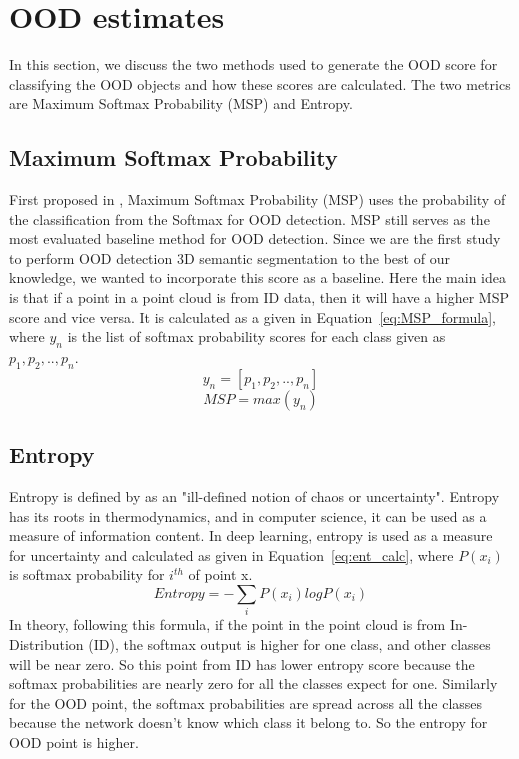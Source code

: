 \section{OOD estimates}
In this section, we discuss the two methods used to generate the OOD score for classifying the OOD objects and how these scores are calculated.
The two metrics are Maximum Softmax Probability (MSP) and Entropy.

\subsection{Maximum Softmax Probability}
First proposed in \cite{hendrycks2016baseline_MSP}, Maximum Softmax Probability (MSP) uses the probability of the classification from the Softmax for OOD detection. 
MSP still serves as the most evaluated baseline method for OOD detection.
Since we are the first study to perform OOD detection 3D semantic segmentation to the best of our knowledge, we wanted to incorporate this score as a baseline. 
Here the main idea is that if a point in a point cloud is from ID data, then it will have a higher MSP score and vice versa.
It is calculated as a given in Equation~\ref{eq:MSP_formula}, where $y_n$ is the list of softmax probability scores for each class given as $p_1, p_2, .., p_n$.
$$y_n = [p_1, p_2,..,p_n]$$
\begin{equation}
    MSP = max(y_n)
    \label{eq:MSP_formula}
\end{equation}

\subsection{Entropy}
\label{sec:meth_entropy}
Entropy is defined by \cite{entropy_robinson} as an "ill-defined notion of chaos or uncertainty".
Entropy has its roots in thermodynamics, and in computer science, it can be used as a measure of information content.
In deep learning, entropy is used as a measure for uncertainty and calculated as given in Equation~\ref{eq:ent_calc}, where $P(x_i)$ is softmax probability for $i^{th}$ of point x.
\begin{equation}
    Entropy = -\sum_i P(x_i) log P(x_i)
    \label{eq:ent_calc}
\end{equation}
In theory, following this formula, if the point in the point cloud is from In-Distribution (ID), the softmax output is higher for one class, and other classes will be near zero.
So this point from ID has lower entropy score because the softmax probabilities are nearly zero for all the classes expect for one.
Similarly for the OOD point, the softmax probabilities are spread across all the classes because the network doesn't know which class it belong to. So the entropy for OOD point is higher.


